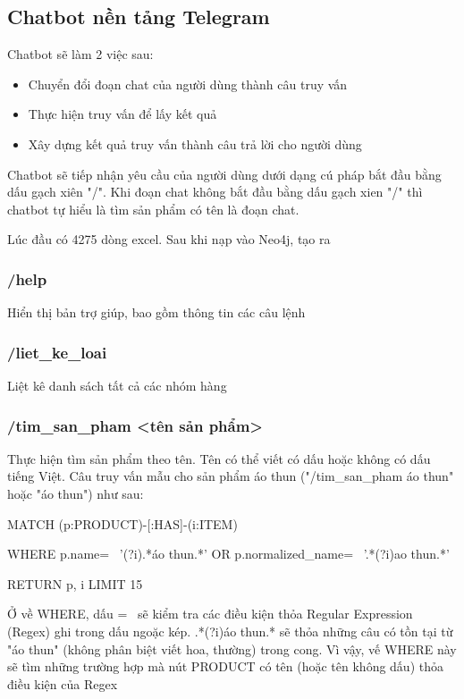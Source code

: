 \subsection{Chatbot nền tảng Telegram}

Chatbot sẽ làm 2 việc sau: 

\begin{itemize}
\item Chuyển đổi đoạn chat của người dùng thành câu truy vấn 
\item Thực hiện truy vấn để lấy kết quả 
\item Xây dựng kết quả truy vấn thành câu trả lời cho người dùng 
\end{itemize}

Chatbot sẽ tiếp nhận yêu cầu của người dùng dưới dạng cú pháp bắt đầu bằng dấu gạch xiên "/". Khi đoạn chat không bắt đầu bằng dấu gạch xien "/" thì chatbot tự hiểu là tìm sản phẩm có tên là đoạn chat.

Lúc đầu có 4275 dòng excel. Sau khi nạp vào Neo4j, tạo ra 

\subsubsection{/help} 
Hiển thị bản trợ giúp, bao gồm thông tin các câu lệnh

\subsubsection{/liet\_ke\_loai}
Liệt kê danh sách tất cả các nhóm hàng 

\subsubsection{/tim\_san\_pham <tên sản phẩm>}
Thực hiện tìm sản phẩm theo tên. Tên có thể viết có dấu hoặc không có dấu tiếng Việt. 
Câu truy vấn mẫu cho sản phẩm áo thun ("/tim\_san\_pham áo thun" hoặc "áo thun") như sau: 

\smallskip

MATCH (p:PRODUCT)-[:HAS]-(i:ITEM) 

WHERE p.name=~ '(?i).*áo thun.*' OR p.normalized\_name=~ '.*(?i)ao thun.*' 

RETURN p, i LIMIT 15

\smallskip

Ở về WHERE, dấu =~ sẽ kiểm tra các điều kiện thỏa Regular Expression (Regex) ghi trong dấu ngoặc kép. 
.*(?i)áo thun.* sẽ thỏa những câu có tồn tại từ "áo thun" (không phân biệt viết hoa, thường) trong cong. Vì vậy, vế WHERE này sẽ tìm những trường hợp mà nút PRODUCT có tên (hoặc tên không dấu) thỏa điều kiện của Regex  

